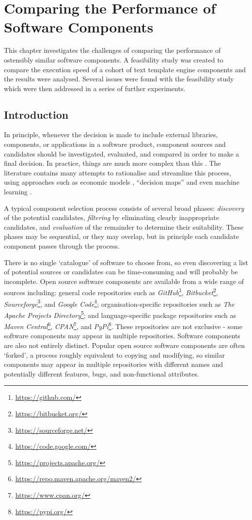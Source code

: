 \chapter{Comparing the Performance of Software Components}
\label{chapter:performance}

This chapter investigates the challenges of comparing the performance of ostensibly similar software components. A feasibility study was created to compare the execution speed of a cohort of text template engine components and the results were analysed. Several issues were found with the feasibility study which were then addressed in a series of further experiments.

\section{Introduction}
\label{fs1:intro}

In principle, whenever the decision is made to include external libraries, components, or applications in a software product, component sources and candidates should be investigated, evaluated, and compared in order to make a final decision. In practice, things are much more complex than this \citep{Badampudi2016}. The literature contains many attempts to rationalise and streamline this process, using approaches such as economic models \citep{Milkman2009}, \enquote{decision maps} \citep{Lago2019} and even machine learning \citep{Maxville2004}.

A typical component selection process consists of several broad phases: \emph{discovery} of the potential candidates, \emph{filtering} by eliminating clearly inappropriate candidates, and \emph{evaluation} of the remainder to determine their suitability. These phases may be sequential, or they may overlap, but in principle each candidate component passes through the process.

There is no single `catalogue' of software to choose from, so even discovering a list of potential sources or candidates can be time-consuming and will probably be incomplete. Open source software components are available from a wide range of sources including: general code repositories such as \emph{GitHub}\footnote{\url{https://github.com/}}, \emph{Bitbucket}\footnote{\url{https://bitbucket.org/}}, \emph{Sourceforge}\footnote{\url{https://sourceforge.net/}}, and \emph{Google Code}\footnote{\url{https://code.google.com/}}; organisation-specific repositories such as \emph{The Apache Projects Directory}\footnote{\url{https://projects.apache.org/}}; and language-specific package repositories such as \emph{Maven Central}\footnote{\url{https://repo.maven.apache.org/maven2/}}, \emph{CPAN}\footnote{\url{https://www.cpan.org/}}, and \emph{PyPi}\footnote{\url{https://pypi.org/}}. These repositories are not exclusive - some software components may appear in multiple repositories. Software components are also not entirely distinct. Popular open source software components are often `forked', a process roughly equivalent to copying and modifying, so similar components may appear in multiple repositories with different names and potentially different features, bugs, and non-functional attributes.

